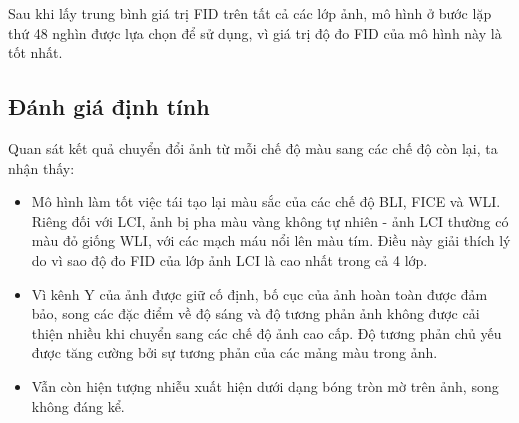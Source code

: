 \documentclass[12pt]{extreport}
\begin{document}
Sau khi lấy trung bình giá trị FID trên tất cả các lớp ảnh, mô hình ở bước lặp thứ 48 nghìn được lựa chọn để sử dụng, vì giá trị độ đo FID của mô hình này là tốt nhất.

\subsection{Đánh giá định tính}

Quan sát kết quả chuyển đổi ảnh từ mỗi chế độ màu sang các chế độ còn lại, ta nhận thấy:
\begin{itemize}
    \item Mô hình làm tốt việc tái tạo lại màu sắc của các chế độ BLI, FICE và WLI. Riêng đối với LCI, ảnh bị pha màu vàng không tự nhiên - ảnh LCI thường có màu đỏ giống WLI, với các mạch máu nổi lên màu tím. Điều này giải thích lý do vì sao độ đo FID của lớp ảnh LCI là cao nhất trong cả 4 lớp.
    \item Vì kênh Y của ảnh được giữ cố định, bố cục của ảnh hoàn toàn được đảm bảo, song các đặc điểm về độ sáng và độ tương phản ảnh không được cải thiện nhiều khi chuyển sang các chế độ ảnh cao cấp. Độ tương phản chủ yếu được tăng cường bởi sự tương phản của các mảng màu trong ảnh.
    \item Vẫn còn hiện tượng nhiễu xuất hiện dưới dạng bóng tròn mờ trên ảnh, song không đáng kể.
\end{itemize}
\end{document}
